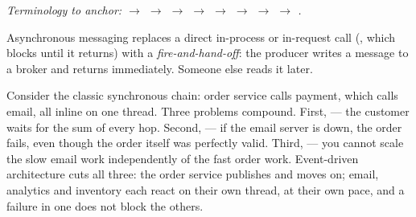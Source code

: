 \begin{center}\small\itshape\color{cInk!70}
Terminology to anchor:  $\rightarrow$  $\rightarrow$  $\rightarrow$  $\rightarrow$  $\rightarrow$  $\rightarrow$  $\rightarrow$  $\rightarrow$ .
\end{center}



 Asynchronous messaging replaces a direct in-process or in-request call (, which blocks until it returns) with a \emph{fire-and-hand-off}: the producer writes a message to a broker and returns immediately. Someone else reads it later.

 Consider the classic synchronous chain: order service calls payment, which calls email, all inline on one thread. Three problems compound. First,  --- the customer waits for the sum of every hop. Second,  --- if the email server is down, the order fails, even though the order itself was perfectly valid. Third,  --- you cannot scale the slow email work independently of the fast order work. Event-driven architecture cuts all three: the order service publishes  and moves on; email, analytics and inventory each react on their own thread, at their own pace, and a failure in one does not block the others.


